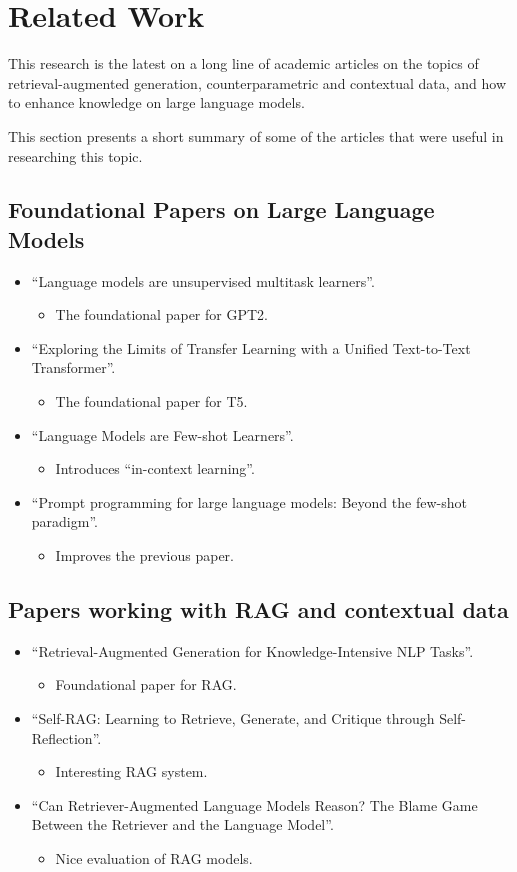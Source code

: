 \section{Related Work}

This research is the latest on a long line of academic articles on the topics of retrieval-augmented generation, counterparametric and contextual data, and how to enhance knowledge on large language models.

This section presents a short summary of some of the articles that were useful in researching this topic.


\subsection{Foundational Papers on Large Language Models}
\newcommand{\mart}[1]{\begin{itemize} \item #1 \end{itemize}}
\begin{itemize}
	\item ``Language models are unsupervised multitask learners''\cite{gpt2}.
		\mart{The foundational paper for GPT2.}
	\item ``Exploring the Limits of Transfer Learning with a Unified Text-to-Text Transformer''\cite{t5}.
		\mart{The foundational paper for T5.}
	\item ``Language Models are Few-shot Learners''\cite{fewshotlearners}.
		\mart{Introduces ``in-context learning''.}
	\item ``Prompt programming for large language models: Beyond the few-shot paradigm''\cite{beyondfewshot}.
		\mart{Improves the previous paper.}
\end{itemize}

\subsection{Papers working with RAG and contextual data}
\begin{itemize}
	\item ``Retrieval-Augmented Generation for Knowledge-Intensive NLP Tasks''\cite{rag}.
		\mart{Foundational paper for RAG.}
	\item ``Self-RAG: Learning to Retrieve, Generate, and Critique through Self-Reflection''\cite{selfrag}.
		\mart{Interesting RAG system.}
	\item ``Can Retriever-Augmented Language Models Reason? The Blame Game Between the Retriever and the Language Model''\cite{can_rag_models_reason}.
		\mart{Nice evaluation of RAG models.}
\end{itemize}

